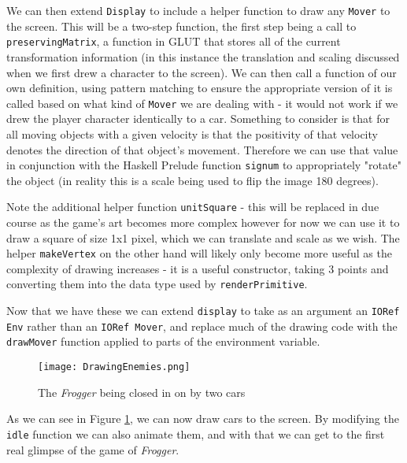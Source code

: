 \documentclass[12pt, a4paper]{report}
\begin{document}
We can then extend \verb|Display| to include a helper function to draw any \verb|Mover| to the screen.
This will be a two-step function, the first step being a call to \verb|preservingMatrix|, a function in GLUT that stores all of the current transformation information (in this instance the translation and scaling discussed when we first drew a character to the screen).
We can then call a function of our own definition, using pattern matching to ensure the appropriate version of it is called based on what kind of \verb|Mover| we are dealing with - it would not work if we drew the player character identically to a car.
Something to consider is that for all moving objects with a given velocity is that the positivity of that velocity denotes the direction of that object's movement.
Therefore we can use that value in conjunction with the Haskell Prelude function \verb|signum| to appropriately "rotate" the object (in reality this is a scale being used to flip the image 180 degrees).

Note the additional helper function \verb|unitSquare| - this will be replaced in due course as the game's art becomes more complex however for now we can use it to draw a square of size 1x1 pixel, which we can translate and scale as we wish.
The helper \verb|makeVertex| on the other hand will likely only become more useful as the complexity of drawing increases - it is a useful constructor, taking 3 points and converting them into the data type used by \verb|renderPrimitive|.

\par

Now that we have these we can extend \verb|display| to take as an argument an \verb|IORef Env| rather than an \verb|IORef Mover|, and replace much of the drawing code with the \verb|drawMover| function applied to parts of the environment variable.

\begin{figure}[ht]
  \centering
  \caption{The \textit{Frogger} being closed in on by two cars}
  \texttt{[image: DrawingEnemies.png]}
  \label{fig:drawingenemies}
\end{figure}

As we can see in Figure \ref{fig:drawingenemies}, we can now draw cars to the screen.
By modifying the \verb|idle| function we can also animate them, and with that we can get to the first real glimpse of the game of \textit{Frogger}.

\par
\end{document}

